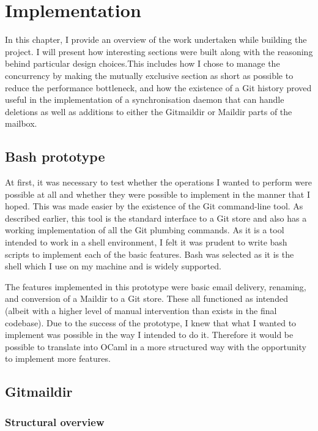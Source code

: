 \chapter{Implementation}

In this chapter, I provide an overview of the work undertaken while building the project. I will present how interesting sections were built along with the reasoning behind particular design choices.This includes how I chose to manage the concurrency by making the mutually exclusive section as short as possible to reduce the performance bottleneck, and how the existence of a Git history proved useful in the implementation of a synchronisation daemon that can handle deletions as well as additions to either the Gitmaildir or Maildir parts of the mailbox.

\section{Bash prototype}

At first, it was necessary to test whether the operations I wanted to perform were possible at all and whether they were possible to implement in the manner that I hoped. This was made easier by the existence of the Git command-line tool. As described earlier, this tool is the standard interface to a Git store and also has a working implementation of all the Git plumbing commands. As it is a tool intended to work in a shell environment, I felt it was prudent to write bash scripts to implement each of the basic features. Bash was selected as it is the shell which I use on my machine and is widely supported.

The features implemented in this prototype were basic email delivery, renaming, and conversion of a Maildir to a Git store. These all functioned as intended (albeit with a higher level of manual intervention than exists in the final codebase). Due to the success of the prototype, I knew that what I wanted to implement was possible in the way I intended to do it. Therefore it would be possible to translate into OCaml in a more structured way with the opportunity to implement more features.

\section{Gitmaildir}

\subsection{Structural overview} \label{section:structuraloverview}

